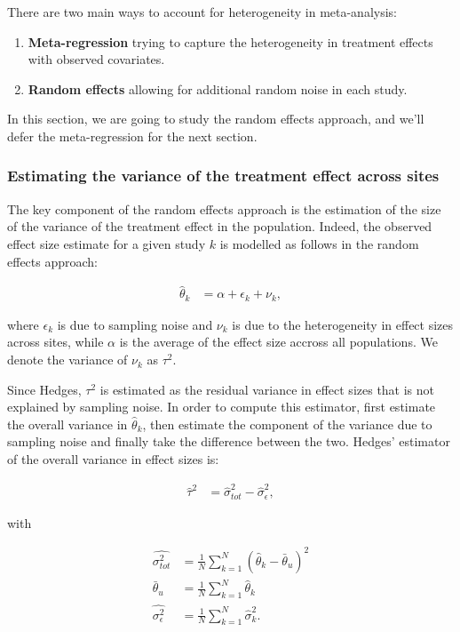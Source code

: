 \documentclass[]{book}
\providecommand{\tightlist}{%
  \setlength{\itemsep}{0pt}\setlength{\parskip}{0pt}}
\theoremstyle{definition}
\theoremstyle{definition}
\theoremstyle{definition}
\theoremstyle{remark}
\begin{document}
There are two main ways to account for heterogeneity in meta-analysis:

\begin{enumerate}
\def\labelenumi{\arabic{enumi}.}
\tightlist
\item
  \textbf{Meta-regression} trying to capture the heterogeneity in
  treatment effects with observed covariates.
\item
  \textbf{Random effects} allowing for additional random noise in each
  study.
\end{enumerate}

In this section, we are going to study the random effects approach, and
we'll defer the meta-regression for the next section.

\subsubsection{Estimating the variance of the treatment effect across
sites}\label{estimating-the-variance-of-the-treatment-effect-across-sites}

The key component of the random effects approach is the estimation of
the size of the variance of the treatment effect in the population.
Indeed, the observed effect size estimate for a given study \(k\) is
modelled as follows in the random effects approach:

\begin{align*}
\hat{\theta}_k & = \alpha + \epsilon_k + \nu_k,
\end{align*}

where \(\epsilon_k\) is due to sampling noise and \(\nu_k\) is due to
the heterogeneity in effect sizes across sites, while \(\alpha\) is the
average of the effect size accross all populations. We denote the
variance of \(\nu_k\) as \(\tau^2\).

Since Hedges, \(\tau^2\) is estimated as the residual variance in effect
sizes that is not explained by sampling noise. In order to compute this
estimator, first estimate the overall variance in \(\hat{\theta}_k\),
then estimate the component of the variance due to sampling noise and
finally take the difference between the two. Hedges' estimator of the
overall variance in effect sizes is:

\begin{align*}
\hat{\tau}^2 & = \hat{\sigma}^2_{tot}-\hat{\sigma}^2_{\epsilon},
\end{align*}

with

\begin{align*}
\hat{\sigma^2_{tot}} & = \frac{1}{N}\sum_{k=1}^N(\hat{\theta}_k-\bar{\theta}_u)^2\\
\bar{\theta}_u & = \frac{1}{N}\sum_{k=1}^N\hat{\theta}_k \\
\hat{\sigma^2_{\epsilon}} & = \frac{1}{N}\sum_{k=1}^N\hat{\sigma}_k^2.
\end{align*}
\end{document}
